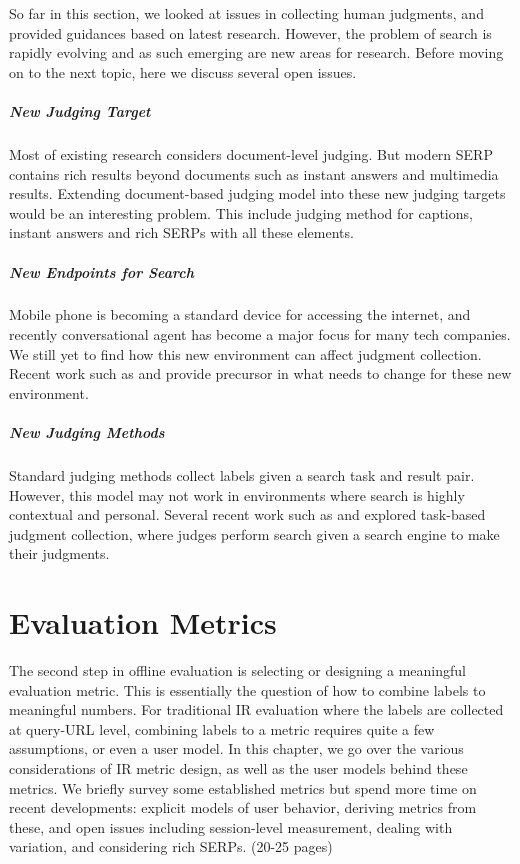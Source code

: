 \documentclass[openany]{now} %
\begin{document}
So far in this section, we looked at issues in collecting human judgments, and provided guidances based on latest research. However, the problem of search is rapidly evolving and as such emerging are new areas for research. Before moving on to the next topic, here we discuss several open issues.

\paragraph{New Judging Target} Most of existing research considers document-level judging. But modern SERP contains rich results beyond documents such as instant answers and multimedia results. Extending document-based judging model into these new judging targets would be an interesting problem. This include judging method for captions, instant answers and rich SERPs with all these elements.

\paragraph{New Endpoints for Search} Mobile phone is becoming a standard device for accessing the internet, and recently conversational agent has become a major focus for many tech companies. We still yet to find how this new environment can affect judgment collection. Recent work such as \cite{VermaY16} and \cite{Kiseleva:2016} provide precursor in what needs to change for these new environment.

\paragraph{New Judging Methods} Standard judging methods collect labels given a search task and result pair. However, this model may not work in environments where search is highly contextual and personal. Several recent work such as  \cite{Moraveji:2011} and \cite{Xu:2009} explored task-based judgment collection, where judges perform search given a search engine to make their judgments.

\chapter{Evaluation Metrics}
\label{c-metric}

The second step in offline evaluation is selecting or designing a meaningful evaluation metric. This is essentially the question of how to combine labels to meaningful numbers. For traditional IR evaluation where the labels are collected at query-URL level, combining labels to a metric requires quite a few assumptions, or even a user model. In this chapter, we go over the various considerations of IR metric design, as well as the user models behind these metrics. We briefly survey some established metrics but spend more time on recent developments: explicit models of user behavior, deriving metrics from these, and open issues including session-level measurement, dealing with variation, and considering rich SERPs. (20-25 pages)
\end{document}

